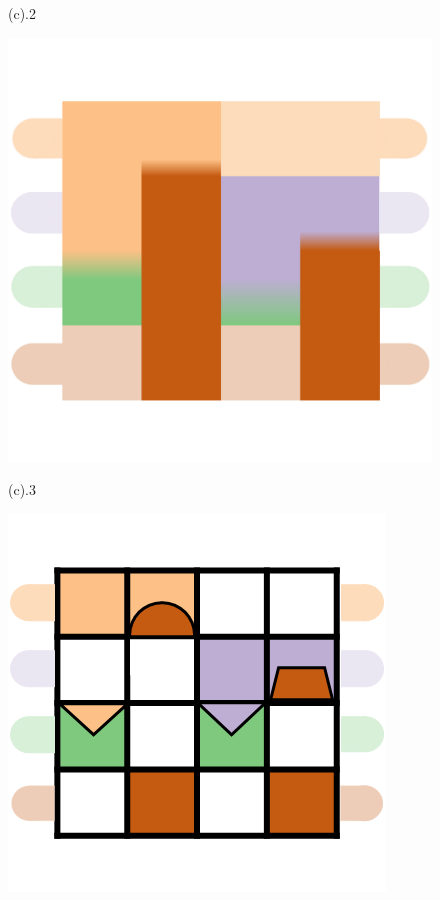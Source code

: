 \documentclass[review,journal]{vgtc}         %
\begin{document}
\begin{figure}[h]
\begin{minipage}{0.24\linewidth}
		\vspace{-1 pt}
		\centerline{(c).2}
		\centerline{\includegraphics[width=\textwidth]{Fig/33.png}}
		\vspace{-1pt}
		\centerline{(c).3}
	\end{minipage}
	\begin{minipage}{0.24\linewidth}
		\centerline{\includegraphics[width=\textwidth]{Fig/41.png}}

\end{minipage}
\end{figure}
\end{document}

